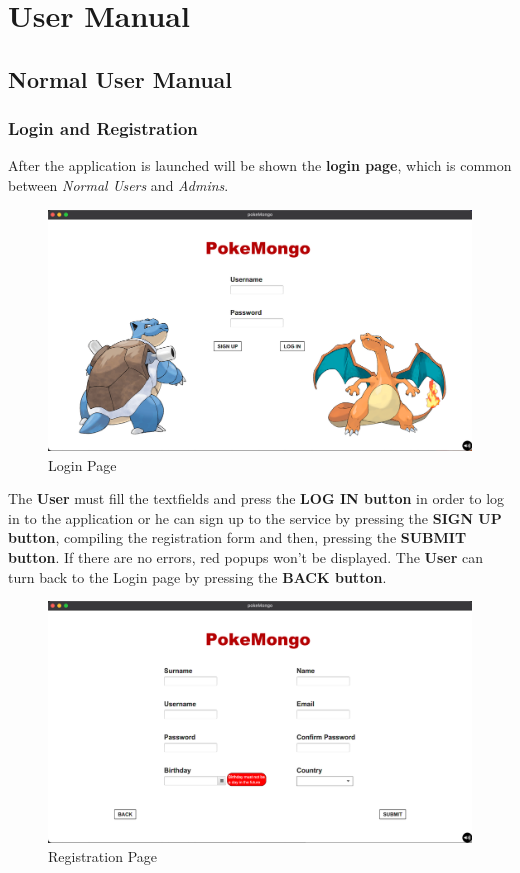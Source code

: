\section{User Manual}
\subsection{Normal User Manual}
\subsubsection{Login and Registration}
After the application is launched will be shown the \textbf{login page}, which is common between \textit{Normal Users} and \textit{Admins}.
\begin{figure}[H]
	\centering
	\includegraphics[width= \textwidth]{img/userManual/login.png}
	\caption{Login Page}
\end{figure}
The \textbf{User} must fill the textfields and press the \textbf{LOG IN button} in order to log in to the application or he can sign up to the service by pressing the \textbf{SIGN UP button}, compiling the registration form and then, pressing the \textbf{SUBMIT button}. If there are no errors, red popups won't be displayed. The \textbf{User} can turn back to the Login page by pressing the \textbf{BACK button}.
\begin{figure}[H]
	\centering
	\includegraphics[width=\textwidth]{img/userManual/registration.png}
	\caption{Registration Page}
\end{figure}
